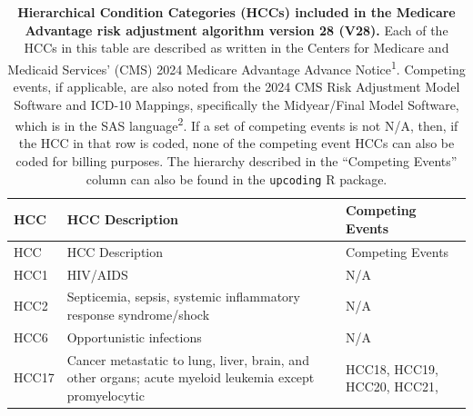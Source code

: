 \documentclass[
  12pt,
  number]{elsarticle}
\begin{document}
\begin{longtable}[]{@{}
  >{\raggedright\arraybackslash}p{}
  >{\raggedright\arraybackslash}p{}
  >{\raggedright\arraybackslash}p{}@{}}
\caption{\textbf{Hierarchical Condition Categories (HCCs) included in
the Medicare Advantage risk adjustment algorithm version 28 (V28).} Each
of the HCCs in this table are described as written in the Centers for
Medicare and Medicaid Services' (CMS) 2024 Medicare Advantage Advance
Notice\textsuperscript{1}. Competing events, if applicable, are also
noted from the 2024 CMS Risk Adjustment Model Software and ICD-10
Mappings, specifically the Midyear/Final Model Software, which is in the
SAS language\textsuperscript{2}. If a set of competing events is not
N/A, then, if the HCC in that row is coded, none of the competing event
HCCs can also be coded for billing purposes. The hierarchy described in
the ``Competing Events'' column can also be found in the
\texttt{upcoding} R package.}\tabularnewline
\toprule\noalign{}
\begin{minipage}[b]{\linewidth}\raggedright
HCC
\end{minipage} & \begin{minipage}[b]{\linewidth}\raggedright
HCC Description
\end{minipage} & \begin{minipage}[b]{\linewidth}\raggedright
Competing Events
\end{minipage} \\
\midrule\noalign{}
\endfirsthead
\toprule\noalign{}
\begin{minipage}[b]{\linewidth}\raggedright
HCC
\end{minipage} & \begin{minipage}[b]{\linewidth}\raggedright
HCC Description
\end{minipage} & \begin{minipage}[b]{\linewidth}\raggedright
Competing Events
\end{minipage} \\
\midrule\noalign{}
\endhead
\bottomrule\noalign{}
\endlastfoot
HCC1 & HIV/AIDS & N/A \\
HCC2 & Septicemia, sepsis, systemic inflammatory response syndrome/shock
& N/A \\
HCC6 & Opportunistic infections & N/A \\
HCC17 & Cancer metastatic to lung, liver, brain, and other organs; acute
myeloid leukemia except promyelocytic & HCC18, HCC19, HCC20, HCC21,

\end{longtable}
\end{document}

